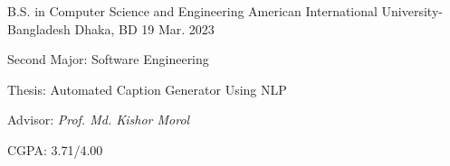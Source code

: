 \begin{cventries}

  \cventry
    {B.S. in Computer Science and Engineering} %
    {American International University- Bangladesh} %
    {Dhaka, BD} %
    {19 Mar. 2023} %
    {  
    \begin{cvitems} %
        \item {Second Major: Software Engineering}
        \item {Thesis: Automated Caption Generator Using NLP}
        \item {Advisor: \textit{Prof. Md. Kishor Morol}}
        \item {CGPA: 3.71/4.00}
    \end{cvitems}
    } 
\end{cventries}
